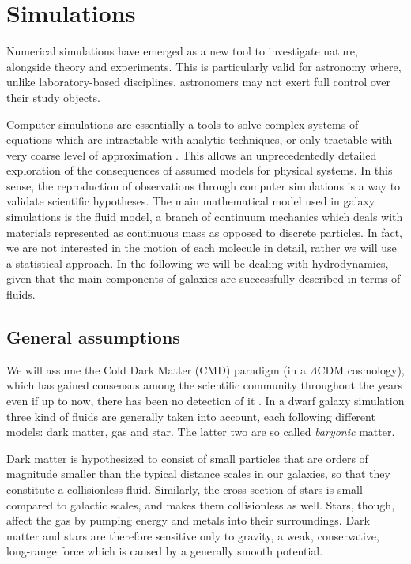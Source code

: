 
\chapter{Simulations}
\label{ch:simulations}

Numerical simulations have emerged as a new tool to investigate nature, alongside theory and experiments.
This is particularly valid for astronomy where, unlike laboratory-based disciplines, astronomers may not exert full control over their study objects\citep{Heng2014}.

Computer simulations are essentially a tools to solve complex systems of equations which are intractable with analytic techniques, or only tractable with very coarse level of approximation \citep{Springel2015}.
This allows an unprecedentedly detailed exploration of the consequences of assumed models for physical systems.
In this sense, the reproduction of observations through computer simulations is a way to validate scientific hypotheses.
The main mathematical model used in galaxy simulations is the fluid model, a branch of continuum mechanics which deals with materials represented as continuous mass as opposed to discrete particles.
In fact, we are not interested in the motion of each molecule in detail, rather we will use a statistical approach.
In the following we will be dealing with hydrodynamics, given that the main components of galaxies are successfully described in terms of fluids.

\section{General assumptions}
We will assume the Cold Dark Matter (CMD) paradigm (in a $\Lambda$CDM cosmology), which has gained consensus among the scientific community throughout the years even if up to now, there has been no detection of it \citep[see e.g.][for an extensive and historical overview]{Einasto2010}.
In a dwarf galaxy simulation three kind of fluids are generally taken into account, each following different models: dark matter, gas and star. The latter two are so called \emph{baryonic} matter.

Dark matter is hypothesized to consist of small particles that are orders of magnitude smaller than the typical distance scales in our galaxies, so that they constitute a collisionless fluid.
Similarly, the cross section of stars is small compared to galactic scales, and makes them collisionless as well.
Stars, though, affect the gas by pumping energy and metals into their surroundings.
Dark matter and stars are therefore sensitive only to gravity, a weak, conservative, long-range force which is caused by a generally smooth potential.

